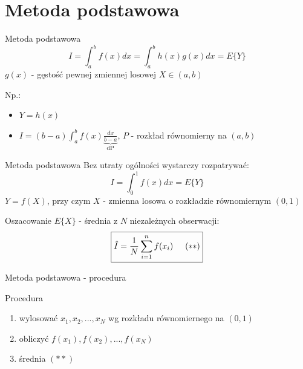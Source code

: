 \section{Metoda podstawowa}
\begin{frame}{Metoda podstawowa}
	\[
    	I = \int_a^b f(x) dx = \int_a^b h(x)g(x) dx = E\{Y\}
    \]
    $g(x)$ - gęstość pewnej zmiennej losowej $X \in (a, b)$
    
    Np.:
    \begin{itemize}
    	\item $Y = h(x)$
        \item $I = (b-a) \int_a^b f(x) \underbrace{\frac{dx}{b-a}}_\text{dP}$, $P$ - rozkład równomierny na $(a, b)$
    \end{itemize}
    
\end{frame}
\begin{frame}{Metoda podstawowa}
    Bez utraty ogólności wystarczy rozpatrywać: \[
    	I = \int_0^1 f(x) dx = E\{Y\}
    \]
    $Y = f(X)$, przy czym $X$ - zmienna losowa o rozkładzie równomiernym $(0, 1)$
    
    Oszacowanie $E\{X\}$ - średnia z $N$ niezależnych obserwacji: \[
    	\boxed{
        \hat{I} = \frac{1}{N} \sum_{i=1}^n f(x_i) \hspace{.5cm} (**)
        }
    \]
\end{frame}
\begin{frame}{Metoda podstawowa - procedura}
    \begin{block}{Procedura}
        \begin{enumerate}[1)]
            \item wylosować $x_1, x_2, ..., x_N$ wg rozkładu równomiernego na $(0, 1)$
            \item obliczyć $f(x_1), f(x_2), ..., f(x_N)$
            \item średnia $(**)$
        \end{enumerate}
    \end{block}
\end{frame}
